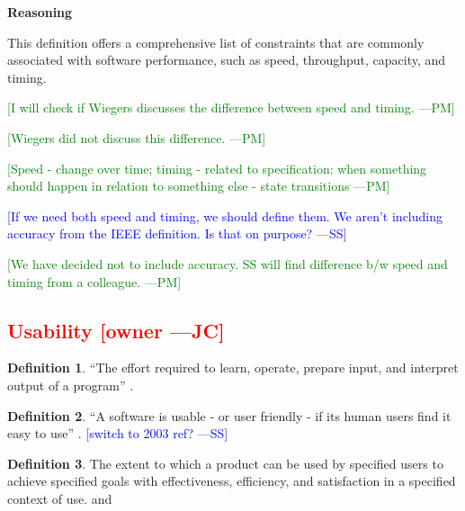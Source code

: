 \documentclass[letterpaper, cleveref]{lipics-v2019}
\newcommand{\authornote}[3]{\textcolor{#1}{[#3 ---#2]}}
\newcommand{\authornote}[3]{}
\newcommand{\wss}[1]{\authornote{blue}{SS}{#1}} %
\newcommand{\jc}[1]{\authornote{red}{JC}{#1}} %
\newcommand{\pmi}[1]{\authornote{green}{PM}{#1}} %
\newcommand{\notdone}[1]{\textcolor{red}{#1}}
\theoremstyle{definition}
\newtheorem{defn}{Definition}
\begin{document}
\noindent \textbf{Reasoning}

This definition offers a comprehensive list of constraints that are commonly
associated with software performance, such as speed, throughput, capacity, and
timing.

\pmi{I will check if Wiegers discusses the difference between speed and
timing.}

\pmi{Wiegers did not discuss this difference.}

\pmi{Speed - change over time; timing - related to specification: when
something should happen in relation to something else - state transitions}

\wss{If we need both speed and timing, we should define them.  We aren't
  including accuracy from the IEEE definition.  Is that on purpose?}

\pmi{We have decided not to include accuracy. SS will find difference b/w
speed and timing from a colleague.}


\subsection{\notdone{Usability} \jc{owner}} 

\begin{defn}
  ``The effort required to learn, operate, prepare input, and interpret output
  of a program'' \citep{McCallEtAl1977}.
\end{defn}

\begin{defn}
  ``A software is usable - or user friendly - if its human users find it easy
  to use'' \citep{ghezzi1991fundamentals}. \wss{switch to 2003 ref?}
\end{defn}

\begin{defn}
  The extent to which a product can be used by specified users to achieve
  specified goals with effectiveness, efficiency, and satisfaction in a
  specified context of use. \cite{ISO16982:2002} and \cite{ISO9241:11}
\end{defn}
\end{document}

